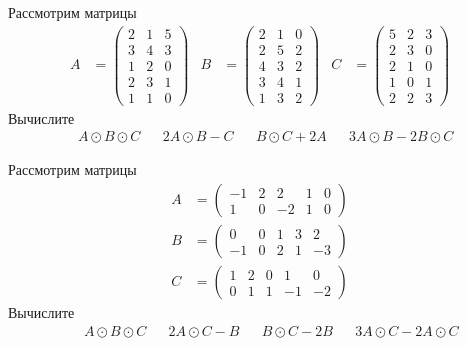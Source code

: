 \begin{exercise}
Рассмотрим матрицы
\begin{align*}
	A&=\begin{pmatrix}
		2 & 1 & 5 \\ 3 & 4 & 3 \\ 1 & 2 & 0 \\ 2 & 3 & 1 \\ 1 & 1 & 0
	\end{pmatrix} &
	B&=\begin{pmatrix}
		2 & 1 & 0 \\ 2 & 5 & 2 \\ 4 & 3 & 2 \\ 3 & 4 & 1 \\ 1 & 3 & 2
	\end{pmatrix} &
		C&=\begin{pmatrix}
		5 & 2 & 3 \\ 2 & 3 & 0 \\ 2 & 1 & 0 \\ 1 & 0 & 1 \\ 2 & 2 & 3
	\end{pmatrix}
\end{align*}
Вычислите
\begin{align*}
	& A\odot B\odot C & &2A\odot B-C & &B\odot C+2A& &3A\odot B-2B\odot C
\end{align*}
\end{exercise}
	
\begin{exercise}
Рассмотрим матрицы
\begin{align*}
	A&=\begin{pmatrix}
		-1 & 2 & 2 & 1 & 0 \\ 1 & 0 & -2 & 1 & 0
	\end{pmatrix} \\
	B&=\begin{pmatrix}
		0 & 0 & 1 & 3 & 2 \\ -1 & 0 & 2 & 1 & -3
	\end{pmatrix} \\
	C&=\begin{pmatrix}
		1 & 2 & 0 & 1 & 0 \\ 0 & 1 & 1 & -1 & -2
	\end{pmatrix}
\end{align*}
Вычислите
\begin{align*}
	& & A\odot B\odot C & &2A\odot C-B & &B\odot C-2B& &3A\odot C-2A\odot C
\end{align*}
\end{exercise}

